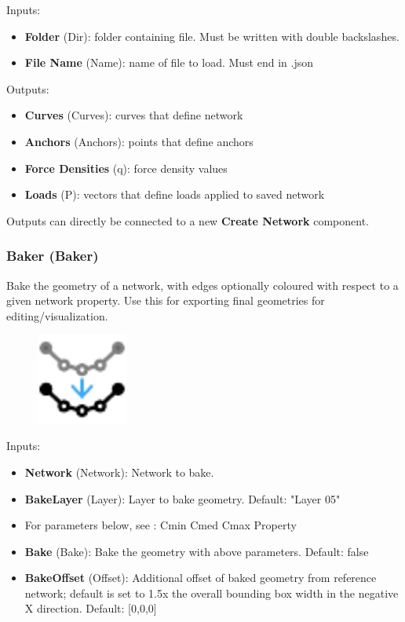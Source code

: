 Inputs:
\begin{itemize}
    \setlength\itemsep{0.05em}
    \item \textbf{Folder} (Dir): folder containing file. Must be written with double backslashes.
    \item \textbf{File Name} (Name): name of file to load. Must end in .json
\end{itemize}

Outputs:
\begin{itemize}
    \setlength\itemsep{0.05em}
    \item \textbf{Curves} (Curves): curves that define network
    \item \textbf{Anchors} (Anchors): points that define anchors
    \item \textbf{Force Densities} (q): force density values
    \item \textbf{Loads} (P): vectors that define loads applied to saved network
\end{itemize}

Outputs can directly be connected to a new \textbf{Create Network} component.

\subsubsection{Baker (Baker)} \label{Baker}
Bake the geometry of a network, with edges optionally coloured with respect to a given network property. Use this for exporting final geometries for editing/visualization.

\begin{figure}[h]
    \centering
    \includegraphics*[width=3cm]{Figures/baker}
\end{figure}

Inputs:
\begin{itemize}
    \setlength\itemsep{0.05em}
    \item \textbf{Network} (Network): Network to bake.
    \item \textbf{BakeLayer} (Layer): Layer to bake geometry. {\color{gray} Default: "Layer 05"}
    \item For parameters below, see :
    \subitem Cmin
    \subitem Cmed
    \subitem Cmax
    \subitem Property
    \item \textbf{Bake} (Bake): Bake the geometry with above parameters. {\color{gray} Default: false}
    \item \textbf{BakeOffset} (Offset): Additional offset of baked geometry from reference network; default is set to 1.5x the overall bounding box width in the negative X direction. {\color{gray} Default: [0,0,0]}
\end{itemize}

